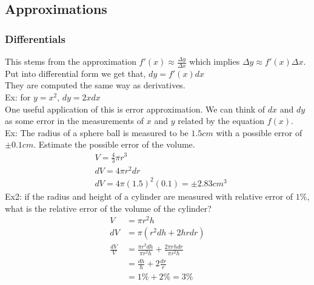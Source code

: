 \subsection{Approximations}

\subsubsection{Differentials}
This stems from the approximation $f'(x)\approx \frac{\Delta y}{\Delta x}$ which implies $\Delta y\approx f'(x)\Delta x$. Put into differential form we get that, $dy=f'(x)dx$\\
They are computed the same way as derivatives.\\
Ex: for $y=x^2$, $dy=2xdx$\\
One useful application of this is error approximation. We can think of $dx$ and $dy$ as some error in the measurements of $x$ and $y$ related by the equation $f(x)$.\\
Ex: The radius of a sphere ball is measured to be $1.5cm$ with a possible error of $\pm 0.1cm$. Estimate the possible error of the volume.
\begin{align*}
    &V=\frac{4}{3}\pi r^3\\
    &dV=4\pi r^2dr\\
    &dV=4\pi(1.5)^2(0.1)=\pm2.83cm^3
\end{align*}
Ex2: if the radius and height of a cylinder are measured with relative error of $1\%$, what is the relative error of the volume of the cylinder?
\begin{align*}
    V&=\pi r^2h\\
    dV&=\pi(r^2dh+2hrdr)\\
    \frac{dV}{V}&=\frac{\pi r^2dh}{\pi r^2h}+\frac{2\pi rhdr}{\pi r^2h}\\
    &=\frac{dh}{h}+2\frac{dr}{r}\\
    &=1\%+2\%=3\%
\end{align*}

